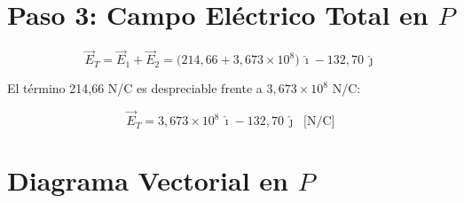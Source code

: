 \documentclass[12pt,letterpaper]{article}
\begin{document}
\section*{Paso 3: Campo El\'ectrico Total en $P$}

\begin{equation*}
    \vec{E}_T = \vec{E}_1 + \vec{E}_2
    = \bigl(214{,}66 + 3{,}673\times10^{8}\bigr)\,\hat{\imath} - 132{,}70\,\hat{\jmath}
\end{equation*}

El t\'ermino 214,66 N/C es despreciable frente a $3{,}673\times10^{8}$ N/C:

\begin{equation*}
    \boxed{\vec{E}_T = 3{,}673\times10^{8}\,\hat{\imath} - 132{,}70\,\hat{\jmath}\;\;\text{[N/C]}}
\end{equation*}

\section*{Diagrama Vectorial en $P$}
\end{document}
